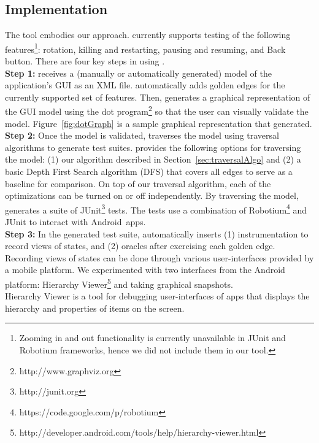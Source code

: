 \subsection{Implementation}

The \tool{} tool embodies our approach.  \tool{} currently supports
testing of the following features\footnote{Zooming in and out
  functionality is currently unavailable in JUnit and Robotium
  frameworks, hence we did not include them in our tool.}: rotation,
killing and restarting, pausing and resuming, and Back button.
{}
There are four key steps in using \tool.
\\
\indent
{\bf Step 1:} \tool{} receives a (manually or automatically generated)
model of the application's GUI as an XML file. \tool{} automatically
adds golden edges for the currently supported set of features.
Then, \tool{} generates a graphical representation of the GUI
model using the dot program\footnote{http://www.graphviz.org} so that
the user can visually validate the model. Figure~\ref{fig:dotGraph} is
a sample graphical representation that \tool{} generated.
\\
\indent
{\bf Step 2:}
Once the model is validated, \tool{} traverses the model using traversal algorithms to generate test suites. \tool{} provides the following options for traversing the model: (1) our algorithm described in Section~\ref{sec:traversalAlgo} and (2) a basic Depth First Search algorithm (DFS) that covers all edges to serve as a baseline for comparison. On top of our traversal algorithm, each of the optimizations can be turned on or off independently. By traversing the model, \tool{} generates a suite of JUnit\footnote{http://junit.org} tests. The tests use a combination of Robotium\footnote{https://code.google.com/p/robotium} and JUnit to interact with Android~apps.
\\
\indent
{\bf Step 3:}
In the generated test suite, \tool{} automatically inserts (1) instrumentation to record views of states, and (2) oracles after exercising each golden edge.
Recording views of states can be done through various user-interfaces provided by a mobile platform. We experimented with two interfaces from the Android platform: Hierarchy Viewer\footnote{http://developer.android.com/tools/help/hierarchy-viewer.html} and taking graphical snapshots.
\\
\indent
Hierarchy Viewer is a tool for debugging user-interfaces of apps that displays the hierarchy and properties of items on the screen.
